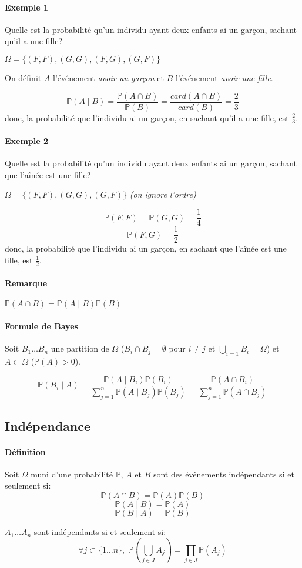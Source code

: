 \documentclass[a4paper,10pt,french]{memoir}
\newcommand{\Proba}{\mathbb{P}}
\newcommand{\inter}{\cap}
\newcommand{\sachant}{\mid}
\begin{document}
\paragraph{Exemple 1}
Quelle est la probabilité qu'un individu ayant deux enfants ai un garçon, sachant qu'il a une fille?

$\Omega = \lbrace (F,F), (G,G), (F,G), (G,F) \rbrace$

On définit $A$ l'événement \emph{avoir un garçon} et $B$ l'événement \emph{avoir une fille}.

\[ \Proba(A \sachant B) = \frac{\Proba(A \inter B)}{\Proba(B)} = \frac{card(A \inter B)}{card(B)} = \frac{2}{3} \]
donc, la probabilité que l'individu ai un garçon, en sachant qu'il a une fille, est $\frac 2 3$.

\paragraph{Exemple 2}
Quelle est la probabilité qu'un individu ayant deux enfants ai un garçon, sachant que l'aînée est une fille?

$\Omega = \lbrace (F,F), (G,G), (G,F) \rbrace$ \textit{(on ignore l'ordre)}

\[ \Proba(F,F)=\Proba(G,G)=\frac 1 4 \]
\[ \Proba(F,G)=\frac 1 2 \]
donc, la probabilité que l'individu ai un garçon, en sachant que l'aînée est une fille, est $\frac 1 2$.

\paragraph{Remarque}
$\Proba(A \inter B) = \Proba(A \sachant B) \Proba(B)$

\paragraph{Formule de Bayes}
Soit $B_1 \dots B_n$ une partition de $\Omega$ ($B_i \inter B_j = \emptyset$ pour $i \neq j$ et $\bigcup_{i=1} B_i = \Omega$) et $A \subset \Omega$ ($\Proba(A) > 0$).

\[
\Proba(B_i \sachant A) = \frac{\Proba(A \sachant B_i) \Proba(B_i)}{\sum_{j=1}^n \Proba(A \sachant B_j) \Proba(B_j)} = \frac{\Proba(A \inter B_i)}{\sum_{j=1}^n \Proba(A \inter B_j)}
\]

\subsection{Indépendance}

\paragraph{Définition}
Soit $\Omega$ muni d'une probabilité $\Proba$, $A$ et $B$ sont des événements indépendants si et seulement si:
\[\Proba(A \inter B) = \Proba(A) \Proba(B)\]
\[\Proba(A \sachant B) = \Proba(A)\]
\[\Proba(B \sachant A) = \Proba(B)\]

$A_1 \dots A_n$ sont indépendants si et seulement si:
\[\forall j \subset \lbrace 1 \dots n \rbrace, \; \Proba(\bigcup_{j \in J} A_j) = \prod_{j \in J} \Proba(A_j)\]
\end{document}
